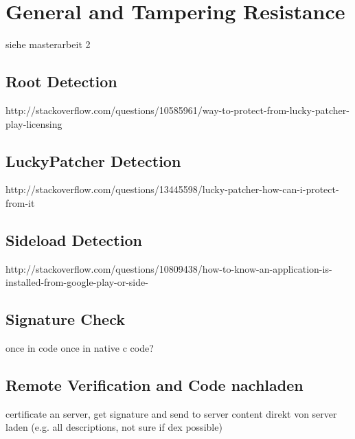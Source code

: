 \section{General and Tampering Resistance}\label{section:generalProtection}
siehe masterarbeit 2

\subsection{Root Detection}\label{subsection:generalProtection-root}
http://stackoverflow.com/questions/10585961/way-to-protect-from-lucky-patcher-play-licensing
\subsection{LuckyPatcher Detection}\label{subsection:generalProtection-luckypatcher}
http://stackoverflow.com/questions/13445598/lucky-patcher-how-can-i-protect-from-it
\subsection{Sideload Detection}\label{subsection:generalProtection-sideload}
http://stackoverflow.com/questions/10809438/how-to-know-an-application-is-installed-from-google-play-or-side-
\subsection{Signature Check}\label{subsection:generalProtection-signature}
once in code \newline
once in native c code?
\subsection{Remote Verification and Code nachladen}\label{subsection:advanced-remote}
certificate an server, get signature and send to server\newline
content direkt von server laden (e.g. all descriptions, not sure if dex possible)
